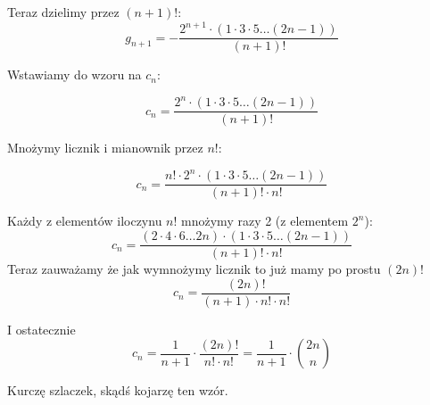        Teraz dzielimy przez $(n+1)!$:
        \begin{equation*}
            g_{n+1} = - \frac{  2^{n+1}  \cdot ( 1 \cdot 3 \cdot 5 \dots (2n - 1)) }{(n+1)!}
        \end{equation*}

        Wstawiamy do wzoru na $c_n$:

        \begin{equation*}
            c_{n} = \frac{  2^n  \cdot ( 1 \cdot 3 \cdot 5 \dots (2n - 1)) }{(n+1)!}
        \end{equation*}

        Mnożymy licznik i mianownik przez $n!$:

          \begin{equation*}
            c_{n} = \frac{  n! \cdot 2^n  \cdot ( 1 \cdot 3 \cdot 5 \dots (2n - 1)) }{(n+1)! \cdot n!}
        \end{equation*}

        Każdy z elementów iloczynu $n!$ mnożymy razy 2 (z elementem $2^n$):
          \begin{equation*}
            c_{n} = \frac{  (2 \cdot 4 \cdot 6 \dots 2n)  \cdot ( 1 \cdot 3 \cdot 5 \dots (2n - 1)) }{(n+1)! \cdot n!}
        \end{equation*}
        Teraz zauważamy że jak wymnożymy licznik to już mamy po prostu $(2n)!$
         \begin{equation*}
            c_{n} = \frac{(2n)!}{(n+1) \cdot n! \cdot n!}
        \end{equation*}

        I ostatecznie
         \begin{equation*}
            c_{n} = \frac{1}{n+1} \cdot \frac{(2n)!}{n! \cdot n!} = \frac{1}{n+1} \cdot \binom{2n}{n}
        \end{equation*}

        Kurczę szlaczek, skądś kojarzę ten wzór. 